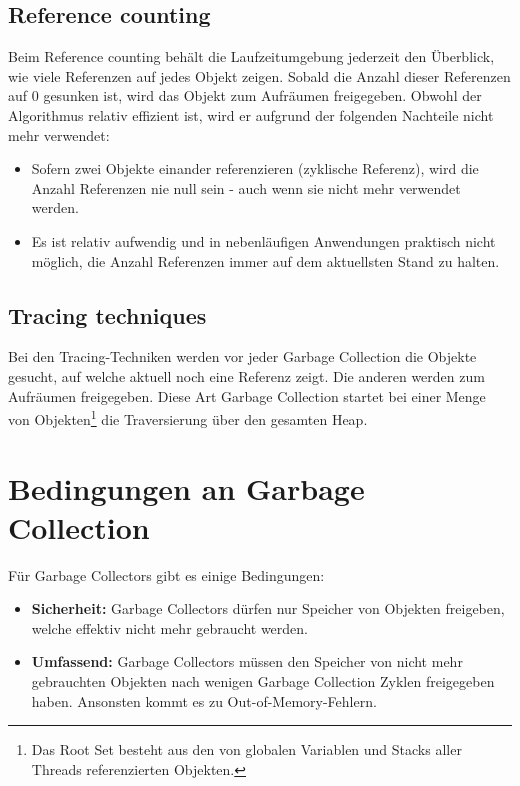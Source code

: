 \subsection{Reference counting}
Beim Reference counting\cite[S. 77]{lagergren2010oracle} behält die Laufzeitumgebung jederzeit den Überblick, wie viele Referenzen auf jedes Objekt zeigen. Sobald die Anzahl dieser Referenzen auf 0 gesunken ist, wird das Objekt zum Aufräumen freigegeben. Obwohl der Algorithmus relativ effizient ist, wird er aufgrund der folgenden Nachteile nicht mehr verwendet:
\begin{itemize}
	\item Sofern zwei Objekte einander referenzieren (zyklische Referenz), wird die Anzahl Referenzen nie null sein - auch wenn sie nicht mehr verwendet werden.
	\item Es ist relativ aufwendig und in nebenläufigen Anwendungen praktisch nicht möglich, die Anzahl Referenzen immer auf dem aktuellsten Stand zu halten.
\end{itemize}
\subsection{Tracing techniques}
Bei den Tracing-Techniken\cite[S. 77]{lagergren2010oracle} werden vor jeder Garbage Collection die Objekte gesucht, auf welche aktuell noch eine Referenz zeigt. Die anderen werden zum Aufräumen freigegeben. Diese Art Garbage Collection startet bei einer Menge von Objekten\footnote{Das Root Set besteht aus den von globalen Variablen und Stacks aller Threads referenzierten Objekten.} die Traversierung über den gesamten Heap.

\section{Bedingungen an Garbage Collection}
Für Garbage Collectors gibt es einige Bedingungen\cite[S. 4]{sunMemoryManagementWP}:
\begin{itemize}
	\item \textbf{Sicherheit:} Garbage Collectors dürfen nur Speicher von Objekten freigeben, welche effektiv nicht mehr gebraucht werden.
	\item \textbf{Umfassend:} Garbage Collectors müssen den Speicher von nicht mehr gebrauchten Objekten nach wenigen Garbage Collection Zyklen freigegeben haben. Ansonsten kommt es zu Out-of-Memory-Fehlern.
\end{itemize}

